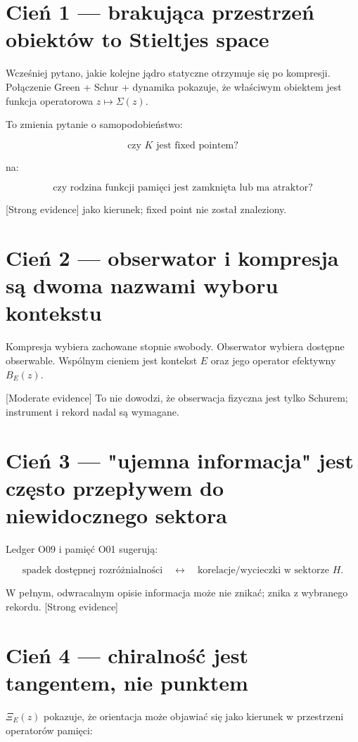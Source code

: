 \documentclass[11pt,a4paper,openany]{report}
\newcommand{\statusStrong}{\textcolor{finblue}{[Strong evidence]}}
\newcommand{\statusModerate}{\textcolor{finviolet}{[Moderate evidence]}}
\begin{document}
\section{Cień 1 --- brakująca przestrzeń obiektów to Stieltjes space}

Wcześniej pytano, jakie kolejne jądro statyczne otrzymuje się po kompresji. Połączenie Green + Schur + dynamika pokazuje, \.ze właściwym obiektem jest funkcja operatorowa \(z\mapsto\Sigma(z)\).

To zmienia pytanie o samopodobieństwo:

\[
\text{czy }K\text{ jest fixed pointem?}
\]

na:

\[
\text{czy rodzina funkcji pamięci jest zamknięta lub ma atraktor?}
\]

\statusStrong{} jako kierunek; fixed point nie został znaleziony.

\section{Cień 2 --- obserwator i kompresja są dwoma nazwami wyboru kontekstu}

Kompresja wybiera zachowane stopnie swobody. Obserwator wybiera dostępne obserwable. Wspólnym cieniem jest kontekst \(E\) oraz jego operator efektywny \(B_E(z)\).

\statusModerate{} To nie dowodzi, \.ze obserwacja fizyczna jest tylko Schurem; instrument i rekord nadal są wymagane.

\section{Cień 3 --- "ujemna informacja" jest często przepływem do niewidocznego sektora}

Ledger O09 i pamięć O01 sugerują:

\[
\text{spadek dostępnej rozró\.znialności}
\quad\leftrightarrow\quad
\text{korelacje/wycieczki w sektorze }H.
\]

W pełnym, odwracalnym opisie informacja mo\.ze nie znikać; znika z wybranego rekordu. \statusStrong{}

\section{Cień 4 --- chiralność jest tangentem, nie punktem}

\(\Xi_E(z)\) pokazuje, \.ze orientacja mo\.ze objawiać się jako kierunek w przestrzeni operatorów pamięci:
\end{document}
